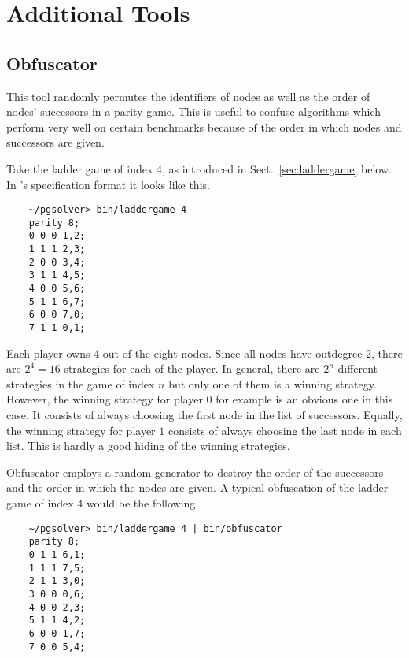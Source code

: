 \section{Additional Tools}
\label{sec:tools}

\subsection{Obfuscator}

This tool randomly permutes the identifiers of nodes as well as the order
of nodes' successors in a parity game. This is useful to confuse algorithms
which perform very well on certain benchmarks because of the order in which
nodes and successors are given.

\begin{example}
Take the ladder game of index 4, as introduced in Sect.~\ref{sec:laddergame}
below. In \pgsolver's specification format it looks like this.
\begin{verbatim}
    ~/pgsolver> bin/laddergame 4
    parity 8;
    0 0 0 1,2;
    1 1 1 2,3;
    2 0 0 3,4;
    3 1 1 4,5;
    4 0 0 5,6;
    5 1 1 6,7;
    6 0 0 7,0;
    7 1 1 0,1;
\end{verbatim}
Each player owns 4 out of the eight nodes. Since all nodes have outdegree 2, there
are $2^4 = 16$ strategies for each of the player. In general, there are $2^n$
different strategies in the game of index $n$ but only one of them is
a winning strategy. However, the winning strategy for player $0$ for example is
an obvious one in this case. It consists of always choosing the first node in the
list of successors. Equally, the winning strategy for player $1$ consists of always
choosing the last node in each list. This is hardly a good hiding of the winning
strategies.

Obfuscator employs a random generator to destroy the order of the successors and
the order in which the nodes are given. A typical obfuscation of the ladder game of
index 4 would be the following.
\begin{verbatim}
    ~/pgsolver> bin/laddergame 4 | bin/obfuscator
    parity 8;
    0 1 1 6,1;
    1 1 1 7,5;
    2 1 1 3,0;
    3 0 0 0,6;
    4 0 0 2,3;
    5 1 1 4,2;
    6 0 0 1,7;
    7 0 0 5,4;
\end{verbatim}
\end{example}

